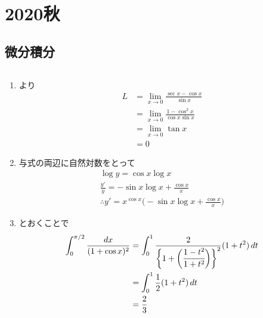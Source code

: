 \section{2020秋}

\setcounter{yearcounter}{2020}


\subsection{微分積分}
\begin{ans*}
  ${}$
  \begin{enumerate}[label=(\alph*)]
    \item {}より
    \begin{align}
      L
      &= \lim_{x\to 0}\frac{\sec x - \cos x}{\sin x} \\
      &= \lim_{x\to 0}\frac{1-\cos^2 x}{\cos x \sin x} \\
      &= \lim_{x\to 0}\tan x \\
      &= 0
    \end{align}
    \item 与式の両辺に自然対数をとって
    \begin{gather}
      \log y = \cos x \log x \\
      \frac{y'}{y} = -\sin x \log x + \frac{\cos x}{x} \\
      \therefore y' = x^{\cos x}\biggl(-\sin x \log x + \frac{\cos x}{x}\biggr)
    \end{gather}
    \item {}とおくことで
    \begin{align}
      \int_{0}^{\pi/2} \frac{dx}{(1+\cos x)^2}
      &= \int_{0}^{1}\frac{2}{\biggl\{ 1+\biggl(\cfrac{1-t^2}{1+t^2}\biggr) \biggr\}^2}(1+t^2)\,dt \\
      &= \int_{0}^{1}\frac{1}{2}(1+t^2)\,dt \\
      &= \frac{2}{3}
    \end{align}
  \end{enumerate}
\end{ans*}

